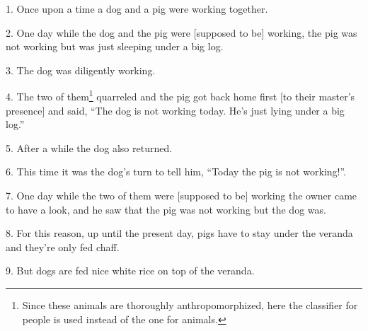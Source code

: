 \setcounter{footnote}{0}

1. Once upon a time a dog and a pig were working together.

2. One day while the dog and the pig were [supposed to be] working, the pig was
not working but was just sleeping under a big log.

3. The dog was diligently working.

4. The two of them\footnote{Since these animals are thoroughly anthropomorphized, here the classifier for people is used instead of the one for animals.} quarreled and the pig got back home first [to their master's
presence] and said, ``The dog is not working today. He's just lying under a big
log.''

5. After a while the dog also returned.

6. This time it was the dog's turn to tell him, ``Today the pig is not working!''.

7. One day while the two of them were [supposed to be] working the owner came to
have a look, and he saw that the pig was not working but the dog was.

8. For this reason, up until the present day, pigs have to stay under the veranda
and they're only fed chaff.

9. But dogs are fed nice white rice on top of the veranda.

